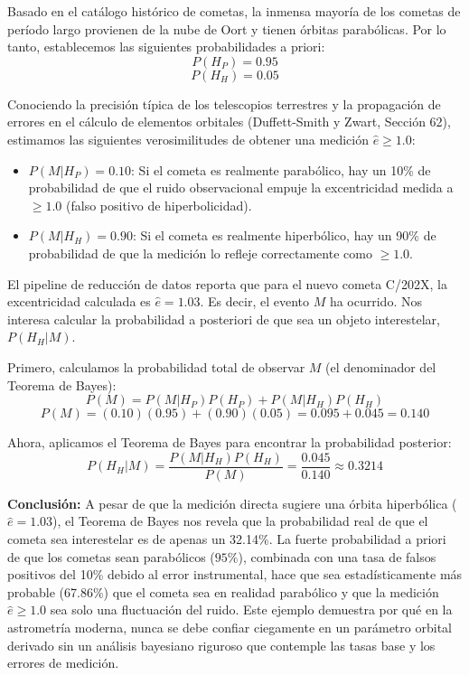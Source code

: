 Basado en el catálogo histórico de cometas, la inmensa mayoría de los cometas de período largo provienen de la nube de Oort y tienen órbitas parabólicas. Por lo tanto, establecemos las siguientes probabilidades a priori:
$$ P(H_P) = 0.95 $$
$$ P(H_H) = 0.05 $$

Conociendo la precisión típica de los telescopios terrestres y la propagación de errores en el cálculo de elementos orbitales (Duffett-Smith y Zwart, Sección 62), estimamos las siguientes verosimilitudes de obtener una medición $\hat{e} \ge 1.0$:
\begin{itemize}
    \item $P(M | H_P) = 0.10$: Si el cometa es realmente parabólico, hay un 10\% de probabilidad de que el ruido observacional empuje la excentricidad medida a $\ge 1.0$ (falso positivo de hiperbolicidad).
    \item $P(M | H_H) = 0.90$: Si el cometa es realmente hiperbólico, hay un 90\% de probabilidad de que la medición lo refleje correctamente como $\ge 1.0$.
\end{itemize}

El pipeline de reducción de datos reporta que para el nuevo cometa C/202X, la excentricidad calculada es $\hat{e} = 1.03$. Es decir, el evento $M$ ha ocurrido. Nos interesa calcular la probabilidad a posteriori de que sea un objeto interestelar, $P(H_H | M)$.

Primero, calculamos la probabilidad total de observar $M$ (el denominador del Teorema de Bayes):
$$ P(M) = P(M | H_P)P(H_P) + P(M | H_H)P(H_H) $$
$$ P(M) = (0.10)(0.95) + (0.90)(0.05) = 0.095 + 0.045 = 0.140 $$

Ahora, aplicamos el Teorema de Bayes para encontrar la probabilidad posterior:
$$ P(H_H | M) = \frac{P(M | H_H) P(H_H)}{P(M)} = \frac{0.045}{0.140} \approx 0.3214 $$

\textbf{Conclusión:} 
A pesar de que la medición directa sugiere una órbita hiperbólica ($\hat{e} = 1.03$), el Teorema de Bayes nos revela que la probabilidad real de que el cometa sea interestelar es de apenas un 32.14\%. La fuerte probabilidad a priori de que los cometas sean parabólicos ($95\%$), combinada con una tasa de falsos positivos del 10\% debido al error instrumental, hace que sea estadísticamente más probable (67.86\%) que el cometa sea en realidad parabólico y que la medición $\hat{e} \ge 1.0$ sea solo una fluctuación del ruido. Este ejemplo demuestra por qué en la astrometría moderna, nunca se debe confiar ciegamente en un parámetro orbital derivado sin un análisis bayesiano riguroso que contemple las tasas base y los errores de medición.
